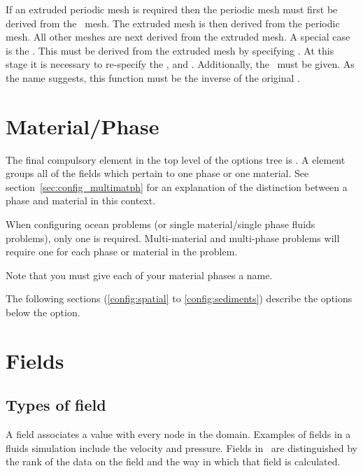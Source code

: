 If an extruded periodic mesh is required then the periodic mesh must first
be derived from the \ mesh. The extruded mesh is then
derived from the periodic mesh. All other meshes are next derived from the
extruded mesh. A special case is the . This must be
derived from the extruded mesh by specifying
. At this stage it
is necessary to re-specify the ,
 and . Additionally, the
\ must be given. As the name suggests, this
function must be the inverse of the original .


\section{Material/Phase}
The final compulsory element in the top level of the options tree is
.  A  element groups all
of the fields which pertain to one phase or one material. See
section~\ref{sec:config_multimatph} for an explanation of the distinction
between a phase and material in this context.

When configuring ocean problems (or single material/single phase fluids
problems), only one  is required.  Multi-material
and multi-phase problems will require one  for each
phase or material in the problem.

Note that you must give each of your material phases a name.

The following sections (\ref{config:spatial} to \ref{config:sediments}) describe the options below the
 option.

\section{Fields}
\subsection{Types of field}

A field associates a value with every node in the domain. Examples of fields
in a fluids simulation include the velocity and pressure. Fields in \fluidity\
are distinguished by the rank of the data on the field and the way in which
that field is calculated. 


